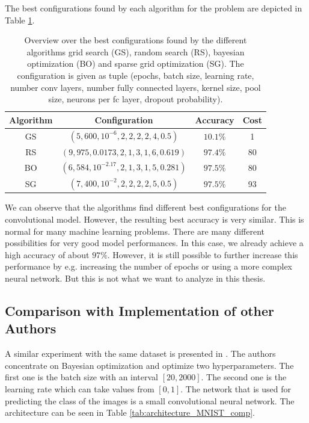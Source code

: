 The best configurations found by each algorithm for the problem are depicted in Table \ref{tab:best_configurations_MNIST}.

\begin{table}[H]
	\caption{ Overview over the best configurations found by the different algorithms grid search (GS), random search (RS), bayesian optimization (BO) and sparse grid optimization (SG). The configuration is given as tuple (epochs, batch size, learning rate, number conv layers, number fully connected layers, kernel size, pool size, neurons per fc layer, dropout probability). }
	\label{tab:best_configurations_MNIST}
	\centering
	\begin{tabular}{| c c c c |} 
		\hline
		Algorithm & Configuration & Accuracy & Cost \\ 
		\hline
		GS & $ (5, 600, 10^{-6}, 2, 2, 2, 2, 4, 0.5) $ & $ 10.1\% $ & 1 \\ 
		RS & $ (9, 975, 0.0173, 2, 1, 3, 1, 6, 0.619) $ & $ 97.4\% $ & 80 \\ 
		BO & $ (6, 584, 10^{-2.17}, 2, 1, 3, 1, 5, 0.281) $ & $ 97.5\% $ & 80 \\ 
		SG & $ (7, 400, 10^{-2}, 2, 2, 2, 2, 5, 0.5) $ & $ 97.5\% $ & 93 \\ 
		\hline
	\end{tabular}
\end{table}

We can observe that the algorithms find different best configurations for the convolutional model. However, the resulting best accuracy is very similar. This is normal for many machine learning problems. There are many different possibilities for very good model performances. In this case, we already achieve a high accuracy of about $ 97\% $. However, it is still possible to further increase this performance by e.g. increasing the number of epochs or using a more complex neural network. But this is not what we want to analyze in this thesis. 

\subsection{Comparison with Implementation of other Authors}

A similar experiment with the same dataset is presented in \cite{WU201926}. The authors concentrate on Bayesian optimization and optimize two hyperparameters. The first one is the batch size with an interval $ [20, 2000] $. The second one is the learning rate which can take values from $ [0,1] $. The network that is used for predicting the class of the images is a small convolutional neural network. The architecture can be seen in Table \ref{tab:architecture_MNIST_comp}.


